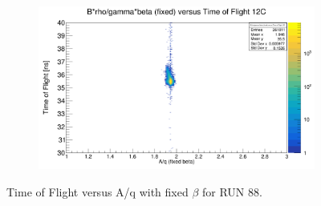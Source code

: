\documentclass[12pt, letterpaper]{article}
\begin{document}
\begin{figure}[!htbp]
\begin{subfigure}{.5\textwidth}
  \caption{}
  \label{fig:sub-second}
\end{subfigure}
\begin{subfigure}{.5\textwidth}
  \centering
  \includegraphics[width=.9\linewidth]{aq_fix_tof12c.png} 
  \caption{}
  \label{fig:sub-second}
\end{subfigure}
\caption{Time of Flight versus A/q with fixed $\beta$ for RUN 88.}
\label{fig:aq_tof_fix}
\end{figure}
\end{document}
